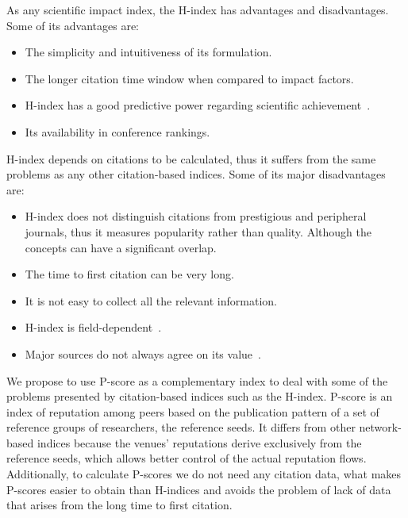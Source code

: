 \documentclass[notitlepage]{svjour3}
\begin{document}
As any scientific impact index, the H-index has advantages and disadvantages. 
Some of its advantages are:

\begin{itemize}
\item The simplicity and intuitiveness of its formulation.
\item The longer citation time window when compared to impact factors.
\item H-index has a good predictive power regarding scientific achievement~\cite{Bornmann2005,Hirsch2007}.
\item Its availability in conference rankings.
\end{itemize}

H-index depends on citations to be calculated, thus it suffers from the 
same problems as any other citation-based indices. Some of its major disadvantages are:

\begin{itemize}
\item H-index does not distinguish citations from prestigious and peripheral journals, thus 
it measures popularity rather than quality. Although the concepts can have a significant overlap.
\item The time to first citation can be very long.
\item It is not easy to collect all the relevant information.
\item H-index is field-dependent~\cite{Wendl2007}.
\item Major sources do not always agree on its value~\cite{Bar-Ilan2008}. 
\end{itemize}

We propose to use P-score as a complementary index to deal with some of the problems
presented by citation-based indices such as the H-index.
P-score is an index of reputation among peers based on the publication pattern of a set of
reference groups of researchers, the reference seeds. It differs from other network-based 
indices because the venues' reputations derive exclusively from the reference seeds, which 
allows better control of the actual reputation flows. Additionally, to calculate P-scores we 
do not need any citation data, what makes P-scores easier to obtain than H-indices and avoids 
the problem of lack of data that arises from the long time to first citation.
\end{document}
